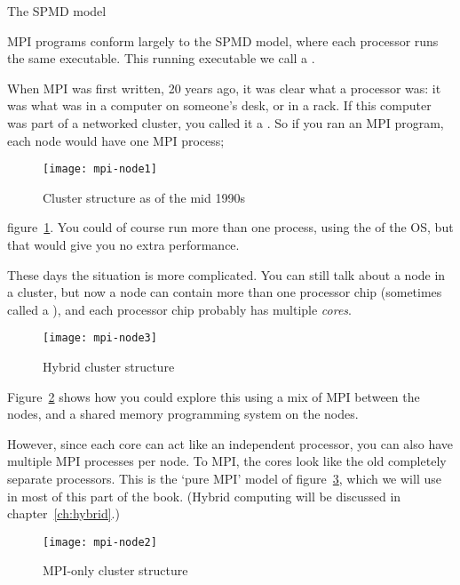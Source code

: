 
 {The SPMD model}
\label{sec:spmd}

MPI programs conform largely
to the \acf{SPMD} model, where each processor runs the same executable.
This running executable we call a .

When MPI was first written, 20 years ago, it was clear what a processor
was: it was what was in a computer on someone's desk, or in a rack.
If this computer was part of a networked cluster, you called it a .
So if you ran an MPI program, each node would have one MPI process;
%
\begin{figure}[ht]
  \texttt{[image: mpi-node1]}
  \caption{Cluster structure as of the mid 1990s}
  \label{fig:oldmpi}
\end{figure}
%
figure~\ref{fig:oldmpi}.
%
You could of course run more than one
process, using the  of the \ac{OS}, but that
would give you no extra performance.

These days the situation is more complicated.
You can still talk about a node in a cluster, but now a node can contain
more than one processor chip (sometimes called a ),
and each processor chip probably has multiple
\emph{cores}.
%
\begin{figure}[ht]
  \texttt{[image: mpi-node3]}
  \caption{Hybrid cluster structure}
  \label{fig:hybridmpi}
\end{figure}
%
Figure~\ref{fig:hybridmpi} shows how you could explore this using a mix
of MPI between the nodes, and a shared memory programming system on the nodes.

However, since each core can act like an independent processor,
you can also have multiple MPI processes per node. To MPI, the cores look
like the old completely separate processors. This is the `pure MPI'
model of figure~\ref{fig:purempi}, which we will use in most of this part
of the book. (Hybrid computing will be discussed in chapter~\ref{ch:hybrid}.)
%
\begin{figure}[ht]
  \texttt{[image: mpi-node2]}
  \caption{MPI-only cluster structure}
  \label{fig:purempi}
\end{figure}
%

